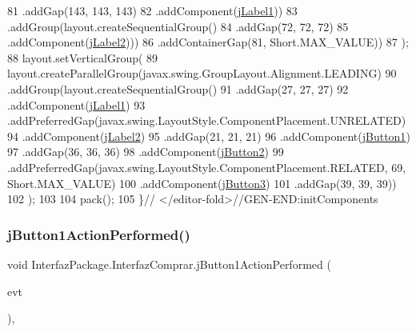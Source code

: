 \begin{DoxyCode}
81                         .addGap(143, 143, 143)
82                         .addComponent(\mbox{\hyperlink{class_interfaz_package_1_1_interfaz_comprar_a59aeb61174932ff58c3f19f7e92450df}{jLabel1}}))
83                     .addGroup(layout.createSequentialGroup()
84                         .addGap(72, 72, 72)
85                         .addComponent(\mbox{\hyperlink{class_interfaz_package_1_1_interfaz_comprar_a3ae8bac05864b4e4109e88784240a350}{jLabel2}})))
86                 .addContainerGap(81, Short.MAX\_VALUE))
87         );
88         layout.setVerticalGroup(
89             layout.createParallelGroup(javax.swing.GroupLayout.Alignment.LEADING)
90             .addGroup(layout.createSequentialGroup()
91                 .addGap(27, 27, 27)
92                 .addComponent(\mbox{\hyperlink{class_interfaz_package_1_1_interfaz_comprar_a59aeb61174932ff58c3f19f7e92450df}{jLabel1}})
93                 .addPreferredGap(javax.swing.LayoutStyle.ComponentPlacement.UNRELATED)
94                 .addComponent(\mbox{\hyperlink{class_interfaz_package_1_1_interfaz_comprar_a3ae8bac05864b4e4109e88784240a350}{jLabel2}})
95                 .addGap(21, 21, 21)
96                 .addComponent(\mbox{\hyperlink{class_interfaz_package_1_1_interfaz_comprar_ab2d3c9abb855370537718c51d54c4a83}{jButton1}})
97                 .addGap(36, 36, 36)
98                 .addComponent(\mbox{\hyperlink{class_interfaz_package_1_1_interfaz_comprar_a60c822302c1ba43e1ab6a812bfc0881b}{jButton2}})
99                 .addPreferredGap(javax.swing.LayoutStyle.ComponentPlacement.RELATED, 69, Short.MAX\_VALUE)
100                 .addComponent(\mbox{\hyperlink{class_interfaz_package_1_1_interfaz_comprar_addad0d7464d6b4d8ce1a868d0b289a13}{jButton3}})
101                 .addGap(39, 39, 39))
102         );
103 
104         pack();
105     \}\textcolor{comment}{// </editor-fold>//GEN-END:initComponents}
\end{DoxyCode}
\mbox{\label{class_interfaz_package_1_1_interfaz_comprar_aedd6af08b9d86de535615bdf8e6d63ae}} 
\subsubsection{\texorpdfstring{j\+Button1\+Action\+Performed()}{jButton1ActionPerformed()}}
{\footnotesize\ttfamily void Interfaz\+Package.\+Interfaz\+Comprar.\+j\+Button1\+Action\+Performed (\begin{DoxyParamCaption}\item[{java.\+awt.\+event.\+Action\+Event}]{evt }\end{DoxyParamCaption})\hspace{0.3cm}{\ttfamily [inline]}, {\ttfamily [private]}}


